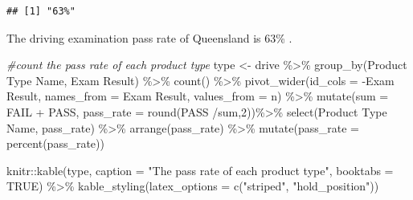 \documentclass[11pt,a4paper,]{article}
\newenvironment{Shaded}{\begin{snugshade}}{\end{snugshade}}
\newcommand{\AttributeTok}[1]{\textcolor[rgb]{0.77,0.63,0.00}{#1}}
\newcommand{\CommentTok}[1]{\textcolor[rgb]{0.56,0.35,0.01}{\textit{#1}}}
\newcommand{\ConstantTok}[1]{\textcolor[rgb]{0.00,0.00,0.00}{#1}}
\newcommand{\DecValTok}[1]{\textcolor[rgb]{0.00,0.00,0.81}{#1}}
\newcommand{\FunctionTok}[1]{\textcolor[rgb]{0.00,0.00,0.00}{#1}}
\newcommand{\NormalTok}[1]{#1}
\newcommand{\OtherTok}[1]{\textcolor[rgb]{0.56,0.35,0.01}{#1}}
\newcommand{\SpecialCharTok}[1]{\textcolor[rgb]{0.00,0.00,0.00}{#1}}
\newcommand{\StringTok}[1]{\textcolor[rgb]{0.31,0.60,0.02}{#1}}
\begin{document}
\begin{verbatim}
## [1] "63%"
\end{verbatim}

The driving examination pass rate of Queensland is 63\% .

\begin{Shaded}
\begin{Highlighting}[]
\CommentTok{\#count the pass rate of each product type}
\NormalTok{type }\OtherTok{\textless{}{-}}\NormalTok{ drive }\SpecialCharTok{\%\textgreater{}\%}
  \FunctionTok{group\_by}\NormalTok{(}\StringTok{\textasciigrave{}}\AttributeTok{Product Type Name}\StringTok{\textasciigrave{}}\NormalTok{, }\StringTok{\textasciigrave{}}\AttributeTok{Exam Result}\StringTok{\textasciigrave{}}\NormalTok{) }\SpecialCharTok{\%\textgreater{}\%}
  \FunctionTok{count}\NormalTok{() }\SpecialCharTok{\%\textgreater{}\%}
  \FunctionTok{pivot\_wider}\NormalTok{(}\AttributeTok{id\_cols =} \SpecialCharTok{{-}}\StringTok{\textasciigrave{}}\AttributeTok{Exam Result}\StringTok{\textasciigrave{}}\NormalTok{,}
              \AttributeTok{names\_from =} \StringTok{\textasciigrave{}}\AttributeTok{Exam Result}\StringTok{\textasciigrave{}}\NormalTok{,}
              \AttributeTok{values\_from =}\NormalTok{ n) }\SpecialCharTok{\%\textgreater{}\%}
  \FunctionTok{mutate}\NormalTok{(}\AttributeTok{sum =}\NormalTok{ FAIL }\SpecialCharTok{+}\NormalTok{ PASS,}
         \AttributeTok{pass\_rate =} \FunctionTok{round}\NormalTok{(PASS }\SpecialCharTok{/}\NormalTok{sum,}\DecValTok{2}\NormalTok{))}\SpecialCharTok{\%\textgreater{}\%}
  \FunctionTok{select}\NormalTok{(}\StringTok{\textasciigrave{}}\AttributeTok{Product Type Name}\StringTok{\textasciigrave{}}\NormalTok{, pass\_rate) }\SpecialCharTok{\%\textgreater{}\%}
  \FunctionTok{arrange}\NormalTok{(pass\_rate) }\SpecialCharTok{\%\textgreater{}\%}
  \FunctionTok{mutate}\NormalTok{(}\AttributeTok{pass\_rate =} \FunctionTok{percent}\NormalTok{(pass\_rate))}

\NormalTok{knitr}\SpecialCharTok{::}\FunctionTok{kable}\NormalTok{(type, }\AttributeTok{caption =} \StringTok{"The pass rate of each product type"}\NormalTok{,}
             \AttributeTok{booktabs =} \ConstantTok{TRUE}\NormalTok{) }\SpecialCharTok{\%\textgreater{}\%}
   \FunctionTok{kable\_styling}\NormalTok{(}\AttributeTok{latex\_options =} \FunctionTok{c}\NormalTok{(}\StringTok{"striped"}\NormalTok{, }\StringTok{"hold\_position"}\NormalTok{))}
\end{Highlighting}
\end{Shaded}
\end{document}
